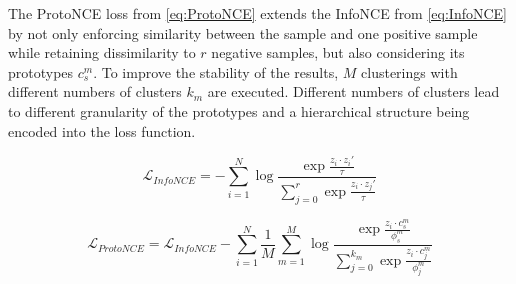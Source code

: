 The ProtoNCE loss from \eqref{eq:ProtoNCE} extends the InfoNCE from \eqref{eq:InfoNCE} 
by not only enforcing similarity between the sample and 
one positive sample while retaining dissimilarity to $r$ negative samples, 
but also considering its prototypes $c^m_s$. 
To improve the stability of the results, $M$ clusterings with different numbers of clusters $k_m$ are 
executed.
Different numbers of clusters lead to different granularity of the prototypes 
and a hierarchical structure being encoded into the loss function.

\begin{equation}
    \mathcal{L}_{InfoNCE}= - \sum_{i=1}^{N}\log\frac{\exp \frac{z_i\cdot z_i'}{\tau}}{\sum_{j=0}^{r}\exp \frac{z_i\cdot z_j'}{\tau}}
    \label{eq:InfoNCE}
\end{equation}

\begin{equation}
    \mathcal{L}_{ProtoNCE}=\mathcal{L}_{InfoNCE} - \sum_{i=1}^{N} \frac{1}{M} \sum_{m=1}^{M} \log\frac{\exp \frac{z_i\cdot c_s^m}{\phi^m_s}}{\sum_{j=0}^{k_m}\exp \frac{z_i\cdot c_j^m}{\phi^m_j}}
    \label{eq:ProtoNCE}
\end{equation}


